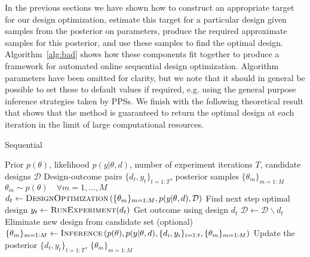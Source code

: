 In the previous sections we have shown how to construct an appropriate target for our design optimization,
estimate this target for a particular design given samples from the posterior on parameters,
produce the required approximate samples for this posterior, and use these samples to find the optimal design.
Algorithm~\ref{alg:bad} shows how these components fit together to produce a framework for
automated online sequential design optimization.  Algorithm parameters have been omitted
for clarity, but we note that it should in general be possible to set these to default values if required, e.g. using
the general purpose inference strategies taken by PPSs.
We finish with the following theoretical result that
shows that the method is guaranteed to return the optimal design at each iteration in the limit of large
computational resources.
\begin{algorithm}[t]
	\small
	\captionsetup{labelfont=bf, justification=justified,singlelinecheck=false}
	\caption{Sequential \Bad \label{alg:bad}}
	\begin{algorithmic}[1]
		\renewcommand{\algorithmicrequire}{\textbf{Inputs:}}
		\renewcommand{\algorithmicensure}{\textbf{Outputs:}}				 
		\Require Prior $p(\theta)$, likelihood $p(y | \theta, d)$, number of experiment iterations $T$,
		candidate designs $\mathcal{D}$
		\Ensure Design-outcome pairs $\{d_t,y_t\}_{t=1:T}$, posterior samples $\{\theta_m\}_{m=1:M}$
		\State $\theta_m\sim p(\theta) \quad \forall m = 1, \dots, M$
		\State $d_t \leftarrow \textsc{DesignOptimization}\left(\{\theta_m\}_{m=1:M},p(y | \theta, d),
		\mathcal{D}\right)$ \Comment Find next step optimal design
		\State $y_t \leftarrow \textsc{RunExperiment}(d_t)$ \Comment Get outcome using design $d_t$
		\State $\mathcal{D}\leftarrow\mathcal{D}\backslash d_t$ 
		\Comment Eliminate new design from candidate set (optional)
		\State $\{\theta_m\}_{m=1:M} \leftarrow \textsc{Inference}\left(p(\theta),p(y | \theta, d),\{d_i,y_i\}_{i=1:t},
		\{\theta_m\}_{m=1:M} \right)$ 
		\Comment  Update the posterior
		\EndFor
		\State \Return $\{d_t,y_t\}_{t=1:T}$, $\{\theta_m\}_{m=1:M}$
	\end{algorithmic}
\end{algorithm}

